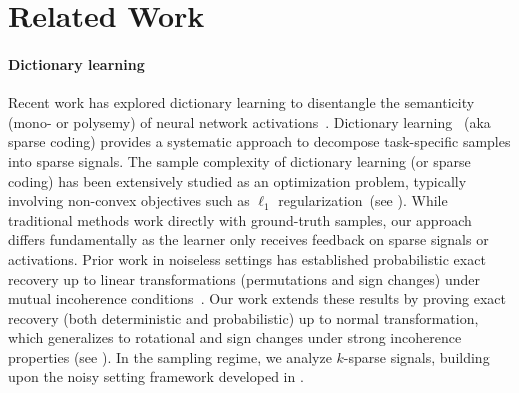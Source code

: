 \section{Related Work}



\paragraph{Dictionary learning}
Recent work has explored dictionary learning to disentangle the semanticity (mono- or polysemy) of neural network activations~\citep{faruqui2015sparse,arora2018linear,subramanian2018spine,zhang2019word,yun2021transformer}. Dictionary learning~\citep{mallat_dict, OLSHAUSEN19973311} (aka sparse coding) provides a systematic approach to decompose task-specific samples into sparse signals. The sample complexity of dictionary learning (or sparse coding) has been extensively studied as an optimization problem, typically involving non-convex objectives such as $\ell_1$ regularization~(see \cite{bachsparse}). While traditional methods work directly with ground-truth samples, our approach differs fundamentally as the learner only receives feedback on sparse signals or activations. Prior work in noiseless settings has established probabilistic exact recovery up to linear transformations (permutations and sign changes) under mutual incoherence conditions~\citep{gribonval_rotation, agarwal_incoherent}. Our work extends these results by proving exact recovery (both deterministic and probabilistic) up to normal transformation, which generalizes to rotational and sign changes under strong incoherence properties (see ). In the sampling regime, we analyze $k$-sparse signals, building upon the noisy setting framework developed in \citet{Arora2013NewAF,bachsparse}. 

